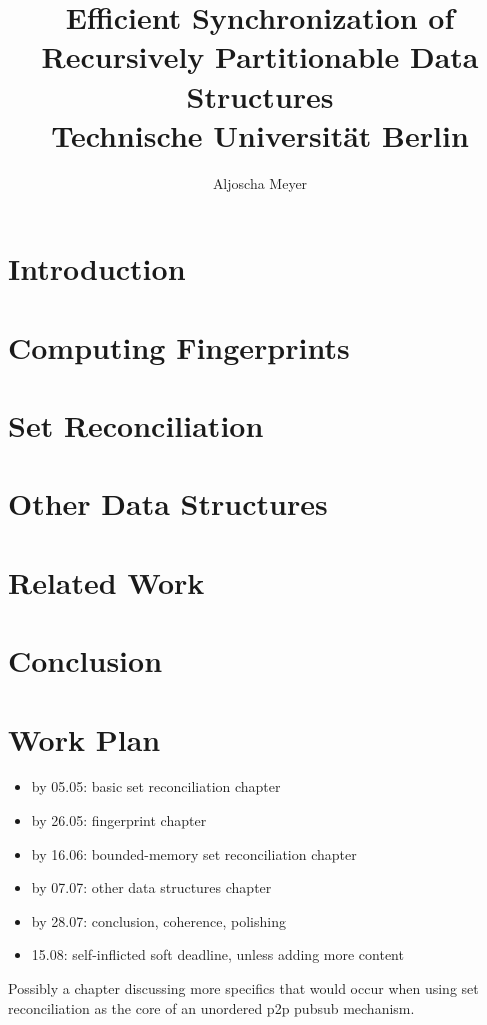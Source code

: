 \documentclass[12pt,twoside]{report}
\title{
{Efficient Synchronization of Recursively Partitionable Data Structures}\\
{\large Technische Universität Berlin}
}
\author{Aljoscha Meyer}
\begin{document}
\maketitle



\tableofcontents

\chapter{Introduction}
\label{introduction}


\chapter{Computing Fingerprints}
\label{fingerprints}


\chapter{Set Reconciliation}
\label{basic-set-reconciliation}


\chapter{Other Data Structures}
\label{other-data-structures}


\chapter{Related Work}
\label{related-work}


\chapter{Conclusion}
\label{conclusion}


\chapter*{Work Plan}

\begin{itemize}
\item by 05.05: basic set reconciliation chapter
\item by 26.05: fingerprint chapter
\item by 16.06: bounded-memory set reconciliation chapter
\item by 07.07: other data structures chapter
\item by 28.07: conclusion, coherence, polishing
\item 15.08: self-inflicted soft deadline, unless adding more content
\end{itemize}

Possibly a chapter discussing more specifics that would occur when using set reconciliation as the core of an unordered p2p pubsub mechanism.



\end{document}
